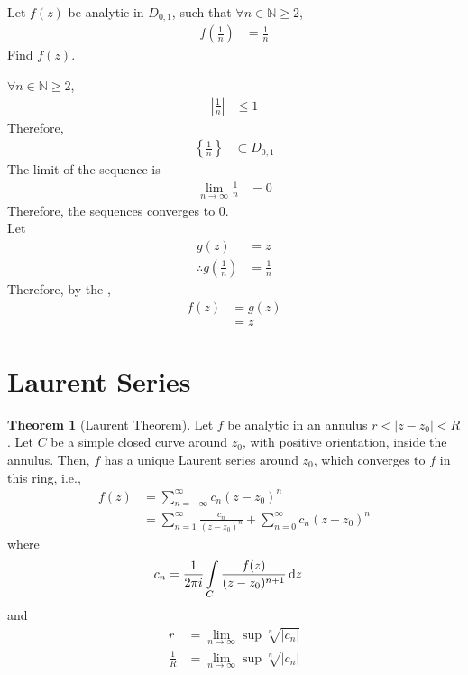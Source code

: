 \documentclass[titlepage, fleqn, a4paper, 12pt, twoside]{article}
\theoremstyle{definition}
\theoremstyle{theorem}
\newtheorem{theorem}{Theorem}
\begin{document}
\begin{question}
	Let $f(z)$ be analytic in $D_{0,1}$, such that $\forall n \in \mathbb{N} \ge 2$,
	\begin{align*}
		f\left( \frac{1}{n} \right) & = \frac{1}{n}
	\end{align*}
	Find $f(z)$.
\end{question}

\begin{solution}
	$\forall n \in \mathbb{N} \ge 2$,
	\begin{align*}
		\left| \frac{1}{n} \right| & \le 1
	\end{align*}
	Therefore,
	\begin{align*}
		\left\{ \frac{1}{n} \right\} & \subset D_{0,1}
	\end{align*}
	The limit of the sequence is
	\begin{align*}
		\lim\limits_{n \to \infty} \frac{1}{n} & = 0
	\end{align*}
	Therefore, the sequences converges to $0$.\\
	Let
	\begin{align*}
		g(z)                                   & = z \\
		\therefore g\left( \frac{1}{n} \right) & = \frac{1}{n}
	\end{align*}
	Therefore, by the ,
	\begin{align*}
		f(z) & = g(z) \\
                     & = z
	\end{align*}
\end{solution}

\section{Laurent Series}

\begin{theorem}[Laurent Theorem]
	Let $f$ be analytic in an annulus $r < |z - z_0| < R$.
	Let $C$ be a simple closed curve around $z_0$, with positive orientation, inside the annulus.
	Then, $f$ has a unique Laurent series around $z_0$, which converges to $f$ in this ring, i.e.,
	\begin{align*}
		f(z) & = \sum\limits_{n = -\infty}^{\infty} c_n (z - z_0)^n \\
                     & = \sum\limits_{n = 1}^{\infty} \frac{c_n}{(z - z_0)^n} + \sum\limits_{n = 0}^{\infty} c_n (z - z_0)^n
	\end{align*}
	where
	\begin{align*}
		c_n & = \frac{1}{2 \pi i} \int\limits_{C} \frac{f(z)}{(z - z_0)^{n + 1}} \dif z
	\end{align*}
	and
	\begin{align*}
		r           & = \lim\limits_{n \to \infty} \sup \sqrt[n]{|c_n|} \\
		\frac{1}{R} & = \lim\limits_{n \to \infty} \sup \sqrt[n]{|c_n|}
	\end{align*}
	\label{thm:Laurent_Theorem}
\end{theorem}
\end{document}
